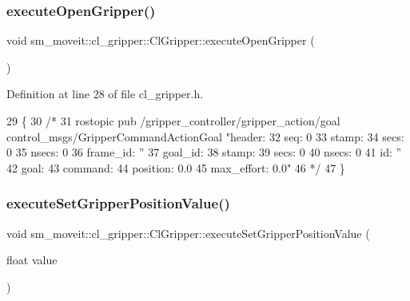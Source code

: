 \subsubsection{\texorpdfstring{execute\+Open\+Gripper()}{executeOpenGripper()}}
{\footnotesize\ttfamily void sm\+\_\+moveit\+::cl\+\_\+gripper\+::\+Cl\+Gripper\+::execute\+Open\+Gripper (\begin{DoxyParamCaption}{ }\end{DoxyParamCaption})\hspace{0.3cm}{\ttfamily [inline]}}



Definition at line 28 of file cl\+\_\+gripper.\+h.


\begin{DoxyCode}
29   \{
30     \textcolor{comment}{/*}
31 \textcolor{comment}{  rostopic pub /gripper\_controller/gripper\_action/goal control\_msgs/GripperCommandActionGoal "header:}
32 \textcolor{comment}{  seq: 0}
33 \textcolor{comment}{  stamp:}
34 \textcolor{comment}{    secs: 0}
35 \textcolor{comment}{    nsecs: 0}
36 \textcolor{comment}{  frame\_id: ''}
37 \textcolor{comment}{goal\_id:}
38 \textcolor{comment}{  stamp:}
39 \textcolor{comment}{    secs: 0}
40 \textcolor{comment}{    nsecs: 0}
41 \textcolor{comment}{  id: ''}
42 \textcolor{comment}{goal:}
43 \textcolor{comment}{  command:}
44 \textcolor{comment}{    position: 0.0}
45 \textcolor{comment}{    max\_effort: 0.0"}
46 \textcolor{comment}{    */}
47   \}
\end{DoxyCode}
\mbox{\label{classsm__moveit_1_1cl__gripper_1_1ClGripper_a8e88fde18660c24285c97d97b372b44f}} 
\subsubsection{\texorpdfstring{execute\+Set\+Gripper\+Position\+Value()}{executeSetGripperPositionValue()}}
{\footnotesize\ttfamily void sm\+\_\+moveit\+::cl\+\_\+gripper\+::\+Cl\+Gripper\+::execute\+Set\+Gripper\+Position\+Value (\begin{DoxyParamCaption}\item[{float}]{value }\end{DoxyParamCaption})\hspace{0.3cm}{\ttfamily [inline]}}



